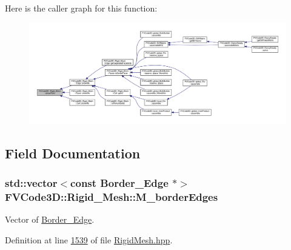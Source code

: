 Here is the caller graph for this function\+:
\nopagebreak
\begin{figure}[H]
\begin{center}
\leavevmode
\includegraphics[width=350pt]{classFVCode3D_1_1Rigid__Mesh_a3bbdb25ce1eddaf66316487bfc05e089_icgraph}
\end{center}
\end{figure}




\subsection{Field Documentation}
\subsubsection[{\texorpdfstring{M\+\_\+border\+Edges}{M_borderEdges}}]{\setlength{\rightskip}{0pt plus 5cm}std\+::vector$<$const {\bf Border\+\_\+\+Edge} $\ast$$>$ F\+V\+Code3\+D\+::\+Rigid\+\_\+\+Mesh\+::\+M\+\_\+border\+Edges\hspace{0.3cm}{\ttfamily [protected]}}\hypertarget{classFVCode3D_1_1Rigid__Mesh_af9ba7882baec8f8e5e7693a38f3cbc9b}{}\label{classFVCode3D_1_1Rigid__Mesh_af9ba7882baec8f8e5e7693a38f3cbc9b}


Vector of \hyperlink{classFVCode3D_1_1Rigid__Mesh_1_1Border__Edge}{Border\+\_\+\+Edge}. 



Definition at line \hyperlink{RigidMesh_8hpp_source_l01539}{1539} of file \hyperlink{RigidMesh_8hpp_source}{Rigid\+Mesh.\+hpp}.

